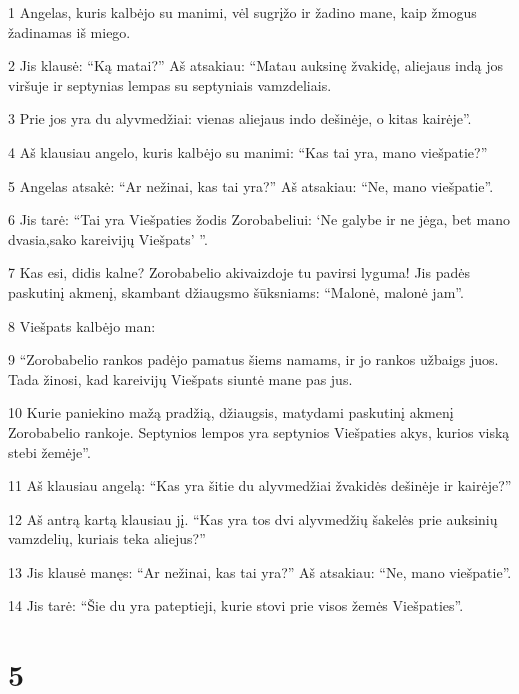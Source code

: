 \par 1 Angelas, kuris kalbėjo su manimi, vėl sugrįžo ir žadino mane, kaip žmogus žadinamas iš miego. 
\par 2 Jis klausė: “Ką matai?” Aš atsakiau: “Matau auksinę žvakidę, aliejaus indą jos viršuje ir septynias lempas su septyniais vamzdeliais. 
\par 3 Prie jos yra du alyvmedžiai: vienas aliejaus indo dešinėje, o kitas kairėje”. 
\par 4 Aš klausiau angelo, kuris kalbėjo su manimi: “Kas tai yra, mano viešpatie?” 
\par 5 Angelas atsakė: “Ar nežinai, kas tai yra?” Aš atsakiau: “Ne, mano viešpatie”. 
\par 6 Jis tarė: “Tai yra Viešpaties žodis Zorobabeliui: ‘Ne galybe ir ne jėga, bet mano dvasia,­sako kareivijų Viešpats’ ”. 
\par 7 Kas esi, didis kalne? Zorobabelio akivaizdoje tu pavirsi lyguma! Jis padės paskutinį akmenį, skambant džiaugsmo šūksniams: “Malonė, malonė jam”. 
\par 8 Viešpats kalbėjo man: 
\par 9 “Zorobabelio rankos padėjo pamatus šiems namams, ir jo rankos užbaigs juos. Tada žinosi, kad kareivijų Viešpats siuntė mane pas jus. 
\par 10 Kurie paniekino mažą pradžią, džiaugsis, matydami paskutinį akmenį Zorobabelio rankoje. Septynios lempos yra septynios Viešpaties akys, kurios viską stebi žemėje”. 
\par 11 Aš klausiau angelą: “Kas yra šitie du alyvmedžiai žvakidės dešinėje ir kairėje?” 
\par 12 Aš antrą kartą klausiau jį. “Kas yra tos dvi alyvmedžių šakelės prie auksinių vamzdelių, kuriais teka aliejus?” 
\par 13 Jis klausė manęs: “Ar nežinai, kas tai yra?” Aš atsakiau: “Ne, mano viešpatie”. 
\par 14 Jis tarė: “Šie du yra pateptieji, kurie stovi prie visos žemės Viešpaties”.



\chapter{5}



